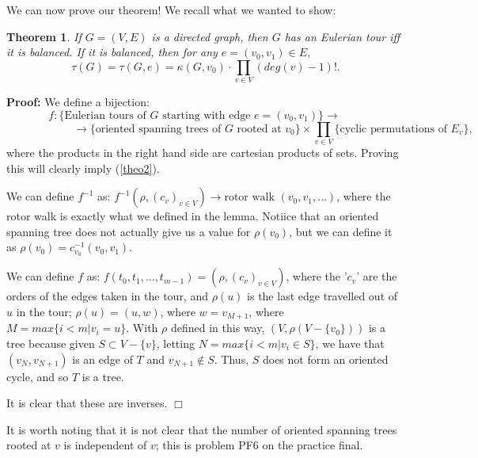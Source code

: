 \documentclass[11pt]{article}
\newtheorem{theorem}{Theorem}
\newenvironment{proof}{\noindent \textbf{Proof:}}{$\Box$}
\begin{document}
We can now prove our theorem! We recall what we wanted to show:

\begin{theorem}
	If $G=(V,E)$ is a directed graph, then $G$ has an Eulerian tour iff it is balanced. If it is balanced, then for any $e=(v_0,v_1)\in E,$
	\begin{equation} \label{theo2} \tau(G) = \tau(G,e) = \kappa(G,v_0)\cdot \prod_{v \in V} (deg(v) - 1)!.\end{equation}
\end{theorem}

\begin{proof}
We define a bijection:
$$f: \{\text{Eulerian tours of } G \text{ starting with edge } e=(v_0,v_1) \} \rightarrow \qquad $$
$$\qquad \qquad \qquad		\rightarrow \{\text{oriented spanning trees of } G \text{ rooted at } v_0 \} \times \prod_{v \in V} \{\text{cyclic permutations of } E_v \},$$
where the products in the right hand side are cartesian products of sets. Proving this will clearly imply (\ref{theo2}).

We can define $f^{-1}$ as: $f^{-1}(\rho,(c_v)_{v \in V}) \rightarrow \text{rotor walk } (v_0,v_1,...)$, where the rotor walk is exactly what we defined in the lemma. Notiice that an oriented spanning tree does not actually give us a value for $\rho(v_0)$, but we can define it as $\rho(v_0)=c_{v_0}^{-1}(v_0,v_1)$. 

We can define $f$ as: $f(t_0,t_1,...,t_{m-1}) = (\rho, (c_v)_{v \in V})$, where the '$c_v$' are the orders of the edges taken in the tour, and $\rho(u)$ is the last edge travelled out of $u$ in the tour; $\rho(u) = (u,w)$, where $w=v_{M+1}$, where $M=max\{i<m|v_i=u\}$. With $\rho$ defined in this way, $(V,\rho(V-\{v_0\}))$ is a tree because given $S\subset V-\{v\}$, letting $N=max\{i<m|v_i \in S\}$, we have that $(v_N,v_{N+1})$ is an edge of $T$ and $v_{N+1} \notin S$. Thus, $S$ does not form an oriented cycle, and so $T$ is a tree.

It is clear that these are inverses.
\end{proof}

It is worth noting that it is not clear that the number of oriented spanning trees rooted at $v$ is independent of $v$; this is problem PF6 on the practice final.
\end{document}
